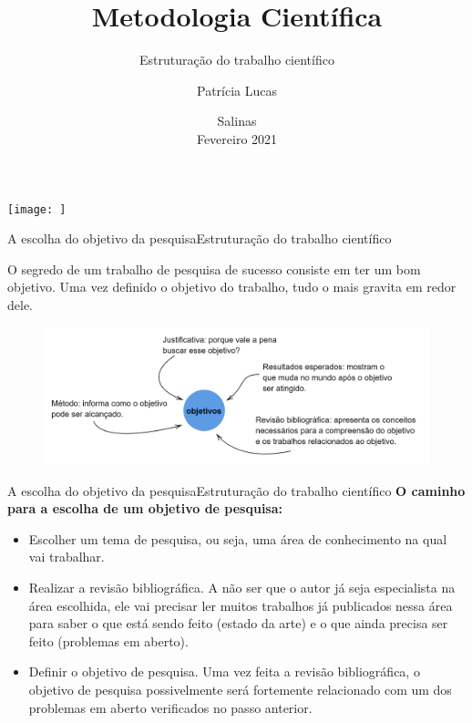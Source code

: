 \documentclass[t]{beamer}
\title[]{Metodologia Científica}
\subtitle[]{Estruturação do trabalho científico}
\author[]{Patrícia Lucas\\{\footnotesize }}
\institute{Bacharelado em Sistemas de Informação \\ IFNMG  - Campus Salinas}
\date{\scriptsize Salinas\\Fevereiro 2021}
\begin{document}
\begin{frame}

\begin{center}
\texttt{[image: ]}
\end{center}
  \titlepage
\end{frame}

\begin{ftst}{A escolha do objetivo da pesquisa}{Estruturação do trabalho científico}
\justifying

O segredo de um trabalho de pesquisa de sucesso consiste em ter um bom objetivo. Uma vez definido o objetivo do trabalho, tudo o mais gravita em redor dele. 
\vone

\begin{figure}
    \centering
    \includegraphics[scale=0.13]{Figuras/03_objetivos.png}
    \label{fig:objetivos}
\end{figure}

\end{ftst}


\begin{ftst}{A escolha do objetivo da pesquisa}{Estruturação do trabalho científico}
\justifying
\textbf{O caminho para a escolha de um objetivo de pesquisa:}
\vone
\begin{itemize}
    \item Escolher um tema de pesquisa, ou seja, uma área de conhecimento na qual vai trabalhar.
    \item Realizar a revisão bibliográfica. A não ser que o autor já seja especialista na área escolhida, ele vai precisar ler muitos trabalhos já publicados nessa área para saber o que está sendo feito (estado da arte) e o que ainda precisa ser feito (problemas em aberto).
    \item Definir o objetivo de pesquisa. Uma vez feita a revisão bibliográfica, o objetivo de pesquisa possivelmente será fortemente relacionado com um dos problemas em aberto verificados no passo anterior.
\end{itemize}

\end{ftst}
\end{document}
